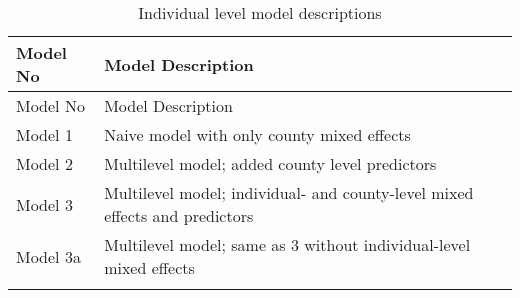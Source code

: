 \documentclass[]{article}
\begin{document}
\begin{longtable}[]{@{}ll@{}}
\caption{Individual level model descriptions
\label{tab:model_desc_individual}}\tabularnewline
\toprule
\begin{minipage}[b]{0.15\columnwidth}\raggedright\strut
Model No\strut
\end{minipage} & \begin{minipage}[b]{0.80\columnwidth}\raggedright\strut
Model Description\strut
\end{minipage}\tabularnewline
\midrule
\endfirsthead
\toprule
\begin{minipage}[b]{0.15\columnwidth}\raggedright\strut
Model No\strut
\end{minipage} & \begin{minipage}[b]{0.80\columnwidth}\raggedright\strut
Model Description\strut
\end{minipage}\tabularnewline
\midrule
\endhead
\begin{minipage}[t]{0.15\columnwidth}\raggedright\strut
Model 1\strut
\end{minipage} & \begin{minipage}[t]{0.80\columnwidth}\raggedright\strut
Naive model with only county mixed effects\strut
\end{minipage}\tabularnewline
\begin{minipage}[t]{0.15\columnwidth}\raggedright\strut
Model 2\strut
\end{minipage} & \begin{minipage}[t]{0.80\columnwidth}\raggedright\strut
Multilevel model; added county level predictors\strut
\end{minipage}\tabularnewline
\begin{minipage}[t]{0.15\columnwidth}\raggedright\strut
Model 3\strut
\end{minipage} & \begin{minipage}[t]{0.80\columnwidth}\raggedright\strut
Multilevel model; individual- and county-level mixed effects and
predictors\strut
\end{minipage}\tabularnewline
\begin{minipage}[t]{0.15\columnwidth}\raggedright\strut
Model 3a\strut
\end{minipage} & \begin{minipage}[t]{0.80\columnwidth}\raggedright\strut
Multilevel model; same as 3 without individual-level mixed effects\strut
\end{minipage}\tabularnewline
\begin{minipage}[t]{0.15\columnwidth}\raggedright\strut

\end{minipage}
\end{longtable}
\end{document}
